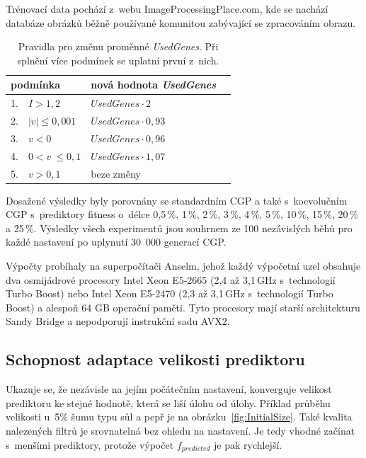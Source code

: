 \documentclass[czech]{ExcelAtFIT} %
\begin{document}
Trénovací data pochází z~webu ImageProcessingPlace.com, kde se nachází databáze obrázků běžně po\-uží\-vané komunitou zabývající se zpracováním obrazu.

\begin{table}[hbt]
    \vskip6pt
    \caption{Pravidla pro změnu proměnné \textit{UsedGenes}. Při splnění více podmínek se uplatní první z~nich.}
    \label{table:rules}
    \centering
    \small
    \renewcommand{\arraystretch}{1.1}
    \begin{tabular}{llll}
        \toprule
        \multicolumn{2}{l}{podmínka}      &  nová hodnota \textit{UsedGenes}  \\
        \midrule
        1. &  $I > 1,2$                   &  $\mathit{UsedGenes} \cdot 2    $     \\
        2. &  $\left|v\right| \leq 0,001$ &  $\mathit{UsedGenes} \cdot 0,93 $  \\
        3. &  $v < 0$                     &  $\mathit{UsedGenes} \cdot 0,96 $  \\
        4. &  $0 < v~\leq 0,1$            &  $\mathit{UsedGenes} \cdot 1,07 $  \\
        5. &  $v > 0,1$                   &  beze změny             \\
        \bottomrule
    \end{tabular}
\end{table}

Dosažené výsledky byly porovnány se standardním CGP a také s~koevolučním CGP s~prediktory fitness o~délce 0,5\,\%, 1\,\%, 2\,\%, 3\,\%, 4\,\%, 5\,\%, 10\,\%, 15\,\%, 20\,\% a 25\,\%. Výsledky všech experimentů jsou souhrnem ze 100 nezávislých běhů pro každé nastavení po uplynutí 30~000 generací CGP.

Výpočty probíhaly na superpočítači Anselm, \mbox{jehož} každý výpočetní uzel obsahuje dva osmijádrové procesory Intel Xeon E5-2665 (2,4 až 3,1\,GHz s~technologií Turbo Boost) nebo Intel Xeon E5-2470 (2,3 až 3,1\,GHz s~technologií Turbo Boost) a alespoň 64 GB operační paměti. Tyto procesory mají starší architekturu Sandy Bridge a nepodporují instrukční sadu AVX2.

\subsection{Schopnost adaptace velikosti prediktoru}

Ukazuje se, že nezávisle na jejím počátečním nastavení, konverguje velikost prediktoru ke stejné hodnotě, která se liší úlohu od úlohy. Příklad průběhu velikosti u~5\% šumu typu sůl a pepř je na obrázku~\ref{fig:InitialSize}. Také kvalita nalezených filtrů je srovnatelná bez ohledu na nastavení. Je tedy vhodné začínat s~men\-šími pre\-dik\-tory, protože výpočet $f_\mathit{predicted}$ je pak rychlejší.
\end{document}
